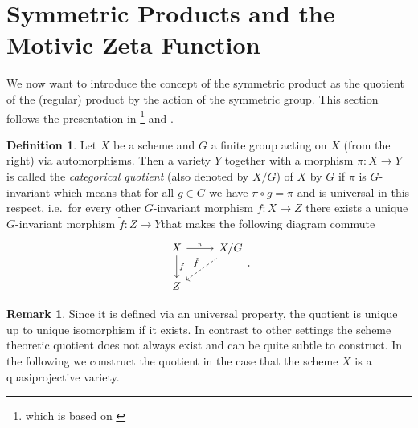 \documentclass[11pt, a4paper, english, twoside]{article}
\theoremstyle{plain}
\theoremstyle{definition}
\newtheorem{definition}[theorem]{Definition}
\newtheorem{remark}[theorem]{Remark}
\begin{document}
\section{Symmetric Products and the Motivic Zeta Function}
\label{symProd}
We now want to introduce the concept of the symmetric product as the quotient of the (regular) product by the
action of the symmetric group. This section follows the presentation in \cite[Appendix A]{mustata}\footnote{which is based on \cite[§7]{MumAV}}
and \cite[Lecture 10]{harris}.
\begin{definition}
    Let $X$ be a scheme and $G$ a finite group acting on $X$ (from the right) 
    via automorphisms. Then a variety $Y$ together with a morphism $\pi \colon X \to Y$  is called the 
    \emph{categorical quotient} (also denoted by $X/G$) of $X$ by $G$ if $\pi$ is $G$-invariant which means that for all $g \in G$ we have
    $\pi \circ g = \pi$ and is universal in this respect, i.e.\ for every other $G$-invariant morphism $f \colon X \to Z$ there exists a unique
    $G$-invariant morphism $\tilde{f} \colon Z \to Y$that makes the following diagram commute
    \begin{equation*}
        \begin{tikzcd}
            X \arrow{r}{\pi} \arrow{d}{f} & X/G \\
            Z \arrow[dashleftarrow]{ur}{\tilde{f}}
        \end{tikzcd}.
    \end{equation*}
\end{definition}

\begin{remark}
    Since it is defined via an universal property, the quotient is unique up to unique isomorphism if it exists. 
    In contrast to other settings the scheme theoretic quotient does not always exist and can be quite subtle to construct.
    In the following we construct the quotient in the case that the scheme $X$ is a quasiprojective variety.
\end{remark}
\end{document}
